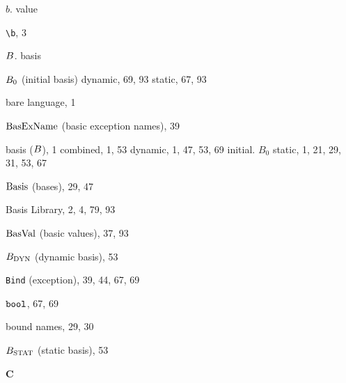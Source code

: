 \begin{theindex}
\indexspace
\item $b$. \see value 
\item \verb+\b+, 3 
\item $B$. \see basis 
\item $B_0$ (initial basis) 
\subitem dynamic, 69, 93
\subitem static, 67, 93
\item bare language, 1
\item ${\rm BasExName}$ (basic exception names), 39
\item basis ($B$), 1
\subitem combined, 1, 53
\subitem dynamic, 1, 47, 53, 69
\subitem initial. \see $B_0$
\subitem static, 1, 21, 29, 31, 53, 67
\item ${\rm Basis}$ (bases), 29, 47
\item Basis Library, 2, 4, 79, 93
\item ${\rm BasVal}$ (basic values), 37, 93
\item $B_{\rm DYN}$ (dynamic basis), 53
\item {\tt Bind} (exception), 39, 44, 67, 69
\item $\mbox{\tt bool}$, 67, 69
\item bound names, 29, 30
\item $B_{\rm STAT}$ (static basis), 53
\indexspace

\parbox{65mm}{\hfil{\large\bf C}\hfil}

\indexspace


\end{theindex}
